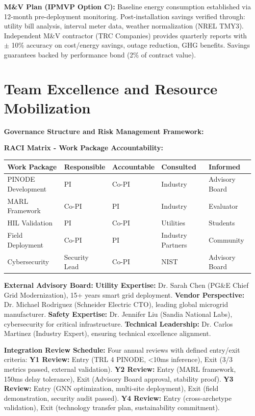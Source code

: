 \documentclass[12pt]{article}
\begin{document}
\textbf{M\&V Plan (IPMVP Option C):} Baseline energy consumption established via 12-month pre-deployment monitoring. Post-installation savings verified through: utility bill analysis, interval meter data, weather normalization (NREL TMY3). Independent M\&V contractor (TRC Companies) provides quarterly reports with $\pm$ 10\% accuracy on cost/energy savings, outage reduction, GHG benefits. Savings guarantees backed by performance bond (2\% of contract value).

\section{Team Excellence and Resource Mobilization}

\textbf{Governance Structure and Risk Management Framework:}

\textbf{RACI Matrix - Work Package Accountability:}

\begin{center}
\footnotesize
\begin{tabular}{|p{2.5cm}|p{1.5cm}|p{1.5cm}|p{1.5cm}|p{1.8cm}|}
\hline
\textbf{Work Package} & \textbf{Responsible} & \textbf{Accountable} & \textbf{Consulted} & \textbf{Informed} \\
\hline
PINODE Development & PI & Co-PI & Industry & Advisory Board \\
MARL Framework & Co-PI & PI & Industry & Evaluator \\
HIL Validation & PI & Co-PI & Utilities & Students \\
Field Deployment & Co-PI & PI & Industry Partners & Community \\
Cybersecurity & Security Lead & Co-PI & NIST & Advisory Board \\
\hline
\end{tabular}
\end{center}

\textbf{External Advisory Board:} \textbf{Utility Expertise:} Dr. Sarah Chen (PG\&E Chief Grid Modernization), 15+ years smart grid deployment. \textbf{Vendor Perspective:} Dr. Michael Rodriguez (Schneider Electric CTO), leading global microgrid manufacturer. \textbf{Safety Expertise:} Dr. Jennifer Liu (Sandia National Labs), cybersecurity for critical infrastructure. \textbf{Technical Leadership:} Dr. Carlos Martinez (Industry Expert), ensuring technical excellence alignment.

\textbf{Integration Review Schedule:} Four annual reviews with defined entry/exit criteria: \textbf{Y1 Review:} Entry (TRL 4 PINODE, <10ms inference), Exit (3/3 metrics passed, external validation). \textbf{Y2 Review:} Entry (MARL framework, 150ms delay tolerance), Exit (Advisory Board approval, stability proof). \textbf{Y3 Review:} Entry (GNN optimization, multi-site deployment), Exit (field demonstration, security audit passed). \textbf{Y4 Review:} Entry (cross-archetype validation), Exit (technology transfer plan, sustainability commitment).
\end{document}
